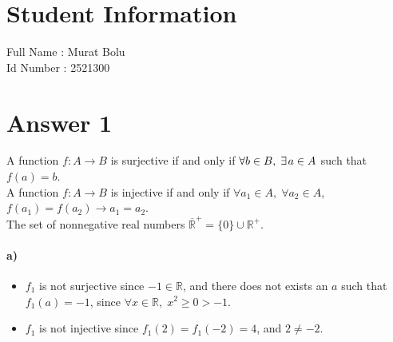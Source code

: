 \documentclass[12pt]{article}
\newcommand\+{\mkern2mu}
\begin{document}
\section*{Student Information } 
Full Name : Murat Bolu \\
Id Number : 2521300 \\

\section*{Answer 1}

A function $f: A \rightarrow B$ is surjective if and only if $\forall b \in B, \; \exists \+ a \in A$ such that $f(a) = b$. \\
A function $f: A \rightarrow B$ is injective if and only if $\forall a_1 \in A, \; \forall a_2 \in A$, $f(a_1) = f(a_2) \rightarrow a_1 = a_2$. \\
The set of nonnegative real numbers $\overline{\mathbb{R}}^+ = \{0\} \cup \mathbb{R}^+$.

\paragraph{a)} %
\begin{itemize}
\item $f_1$ is not surjective since $-1 \in \mathbb{R}$, and there does not exists an $a$ such that $f_1(a) = -1$, since $\forall x \in \mathbb{R}, \; x^2 \geq 0 > -1$.
\item $f_1$ is not injective since $f_1(2) = f_1(-2) = 4$, and $2 \neq -2$.
\end{itemize}
\end{document}
